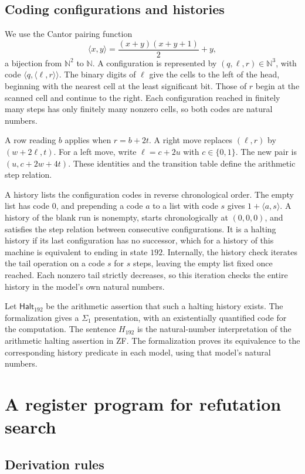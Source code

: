 \documentclass[11pt,letterpaper]{article}
\newcommand{\N}{\mathbb{N}}
\newcommand{\pair}[2]{\langle #1,#2\rangle}
\newcommand{\Halt}{H_{192}}
\newcommand{\phys}{\mathsf{Halt}_{192}}
\begin{document}
\subsection{Coding configurations and histories}

We use the Cantor pairing function
\[
  \pair{x}{y}=\frac{(x+y)(x+y+1)}{2}+y,
\]
a bijection from $\N^2$ to $\N$. A configuration is represented by
$(q,\ell,r)\in\N^3$, with code $\pair{q}{\pair{\ell}{r}}$.
The binary digits of $\ell$ give the cells to the left of the head,
beginning with the nearest cell at the least significant bit.
Those of $r$ begin at the scanned cell and continue to the right.
Each configuration reached in finitely many steps has only finitely
many nonzero cells, so both codes are natural numbers.

A row reading $b$ applies when $r=b+2t$. A right move replaces
$(\ell,r)$ by $(w+2\ell,t)$. For a left move, write $\ell=c+2u$
with $c\in\{0,1\}$. The new pair is $(u,c+2w+4t)$. These
identities and the transition table define the arithmetic step relation.

A history lists the configuration codes in reverse chronological order.
The empty list has code $0$, and prepending a code $a$ to a list
with code $s$ gives $1+\pair{a}{s}$. A history of the blank run is
nonempty, starts chronologically at $(0,0,0)$, and satisfies the step
relation between consecutive configurations. It is a halting history
if its last configuration has no successor, which for a history of
this machine is equivalent to ending in state $192$. Internally, the
history check iterates the tail operation on a code $s$ for $s$ steps,
leaving the empty list fixed once reached. Each nonzero tail strictly
decreases, so this iteration checks the entire history in the model's
own natural numbers.

Let $\phys$ be the arithmetic assertion that such a halting history
exists. The formalization gives a $\Sigma_1$ presentation, with an
existentially quantified code for the computation. The sentence $\Halt$ is the
natural-number interpretation of the arithmetic halting assertion
in ZF. The formalization proves its equivalence to the corresponding
history predicate in each model, using that model's natural numbers.

\section{A register program for refutation search}\label{sec:search}

\subsection{Derivation rules}
\end{document}
